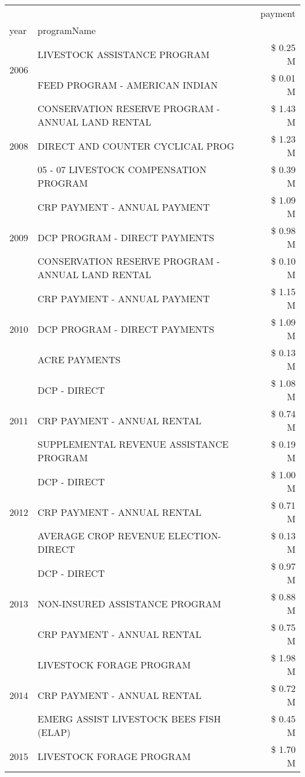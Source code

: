 \begin{tabular}{llr}
\toprule
 &  & payment \\
year & programName &  \\
\midrule
\multirow[t]{2}{*}{2006} & LIVESTOCK ASSISTANCE PROGRAM & \$ 0.25 M \\
 & FEED PROGRAM - AMERICAN INDIAN & \$ 0.01 M \\
\cline{1-3}
\multirow[t]{3}{*}{2008} & CONSERVATION RESERVE PROGRAM - ANNUAL LAND RENTAL & \$ 1.43 M \\
 & DIRECT AND COUNTER CYCLICAL PROG & \$ 1.23 M \\
 & 05 - 07 LIVESTOCK COMPENSATION PROGRAM & \$ 0.39 M \\
\cline{1-3}
\multirow[t]{3}{*}{2009} & CRP PAYMENT - ANNUAL PAYMENT & \$ 1.09 M \\
 & DCP PROGRAM - DIRECT PAYMENTS & \$ 0.98 M \\
 & CONSERVATION RESERVE PROGRAM - ANNUAL LAND RENTAL & \$ 0.10 M \\
\cline{1-3}
\multirow[t]{3}{*}{2010} & CRP PAYMENT - ANNUAL PAYMENT & \$ 1.15 M \\
 & DCP PROGRAM - DIRECT PAYMENTS & \$ 1.09 M \\
 & ACRE PAYMENTS & \$ 0.13 M \\
\cline{1-3}
\multirow[t]{3}{*}{2011} & DCP - DIRECT & \$ 1.08 M \\
 & CRP PAYMENT - ANNUAL RENTAL & \$ 0.74 M \\
 & SUPPLEMENTAL REVENUE ASSISTANCE PROGRAM & \$ 0.19 M \\
\cline{1-3}
\multirow[t]{3}{*}{2012} & DCP - DIRECT & \$ 1.00 M \\
 & CRP PAYMENT - ANNUAL RENTAL & \$ 0.71 M \\
 & AVERAGE CROP REVENUE ELECTION-DIRECT & \$ 0.13 M \\
\cline{1-3}
\multirow[t]{3}{*}{2013} & DCP - DIRECT & \$ 0.97 M \\
 & NON-INSURED ASSISTANCE PROGRAM & \$ 0.88 M \\
 & CRP PAYMENT - ANNUAL RENTAL & \$ 0.75 M \\
\cline{1-3}
\multirow[t]{3}{*}{2014} & LIVESTOCK FORAGE PROGRAM & \$ 1.98 M \\
 & CRP PAYMENT - ANNUAL RENTAL & \$ 0.72 M \\
 & EMERG ASSIST LIVESTOCK BEES FISH (ELAP) & \$ 0.45 M \\
\cline{1-3}
\multirow[t]{3}{*}{2015} & LIVESTOCK FORAGE PROGRAM & \$ 1.70 M \\

\end{tabular}
